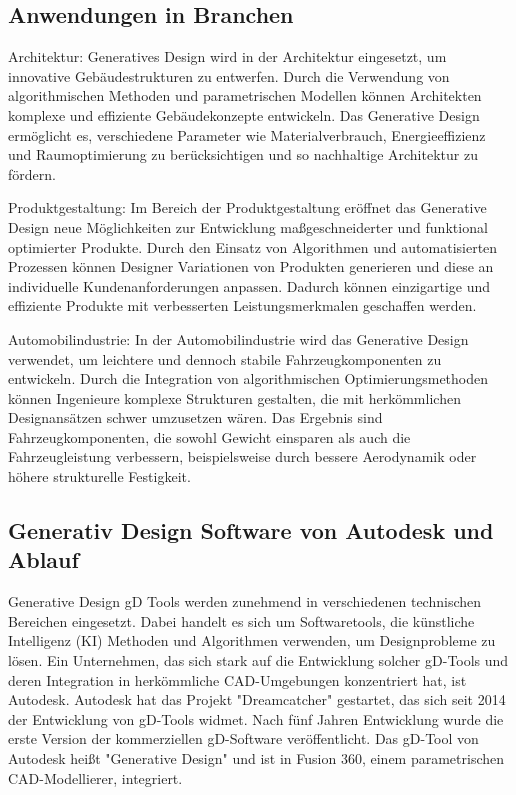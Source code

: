 \subsection*{Anwendungen in Branchen}
Architektur: Generatives Design wird in der Architektur eingesetzt, um innovative Gebäudestrukturen zu entwerfen. Durch die Verwendung von algorithmischen Methoden und parametrischen Modellen können Architekten komplexe und effiziente Gebäudekonzepte entwickeln. Das Generative Design ermöglicht es, verschiedene Parameter wie Materialverbrauch, Energieeffizienz und Raumoptimierung zu berücksichtigen und so nachhaltige Architektur zu fördern.

Produktgestaltung: Im Bereich der Produktgestaltung eröffnet das Generative Design neue Möglichkeiten zur Entwicklung maßgeschneiderter und funktional optimierter Produkte. Durch den Einsatz von Algorithmen und automatisierten Prozessen können Designer Variationen von Produkten generieren und diese an individuelle Kundenanforderungen anpassen. Dadurch können einzigartige und effiziente Produkte mit verbesserten Leistungsmerkmalen geschaffen werden.

Automobilindustrie: In der Automobilindustrie wird das Generative Design verwendet, um leichtere und dennoch stabile Fahrzeugkomponenten zu entwickeln. Durch die Integration von algorithmischen Optimierungsmethoden können Ingenieure komplexe Strukturen gestalten, die mit herkömmlichen Designansätzen schwer umzusetzen wären. Das Ergebnis sind Fahrzeugkomponenten, die sowohl Gewicht einsparen als auch die Fahrzeugleistung verbessern, beispielsweise durch bessere Aerodynamik oder höhere strukturelle Festigkeit.

\subsection*{Generativ Design Software von Autodesk und Ablauf}

Generative Design \ac*{gD} Tools werden zunehmend in verschiedenen technischen Bereichen eingesetzt. Dabei handelt es sich um Softwaretools, die künstliche Intelligenz (KI) Methoden und Algorithmen verwenden, um Designprobleme zu lösen. Ein Unternehmen, das sich stark auf die Entwicklung solcher \ac*{gD}-Tools und deren Integration in herkömmliche \ac*{CAD}-Umgebungen konzentriert hat, ist Autodesk. Autodesk hat das Projekt "Dreamcatcher" gestartet, das sich seit 2014 der Entwicklung von \ac*{gD}-Tools widmet. Nach fünf Jahren Entwicklung wurde die erste Version der kommerziellen \ac*{gD}-Software veröffentlicht. Das \ac*{gD}-Tool von Autodesk heißt "Generative Design" und ist in Fusion 360, einem parametrischen \ac*{CAD}-Modellierer, integriert. 

